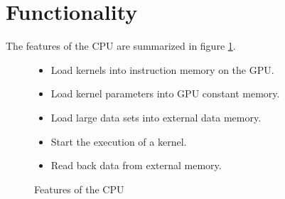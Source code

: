 \documentclass[../main/report.tex]{subfiles}
\begin{document}
\section{Functionality}

The features of the CPU are summarized in figure \ref{fig:cpu_features}.

\begin{figure}[H]
    \begin{itemize}
      \item Load kernels into instruction memory on the GPU.
      \item Load kernel parameters into GPU constant memory.
      \item Load large data sets into external data memory.
      \item Start the execution of a kernel.
      \item Read back data from external memory.
    \end{itemize}
    \caption{Features of the CPU}
    \label{fig:cpu_features}
\end{figure}
\end{document}
